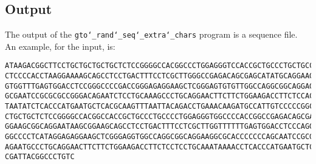 \subsection*{Output}
The output of the \texttt{gto\char`_rand\char`_seq\char`_extra\char`_chars} program is a sequence file.\\
An example, for the input, is:
\begin{lstlisting}
ATAAGACGGCTTCCTGCTGCTGCTGCTCTCCGGGGCCACGGCCCTGGAGGGTCCACCGCTGCCCTGCTGCCATTGTCCCC
CTCCCCACCTAAGGAAAAGCAGCCTCCTGACTTTCCTCGCTTGGGCCGAGACAGCGAGCATATGCAGGAAGCGGCAGGAA
GTGGTTTGAGTGGACCTCCGGGCCCCGACCGGGAGAGGAAGCTCGGGAGTGTGTTGGCCAGGCGGCAGGAGACCAGTGCC
GCGAATCCGCGCGCCGGGACAGAATCTCCTGCAAAGCCCTGCAGGAACTTCTTCTGGAAGACCTTCTCCACCCCCCCAGC
TAATATCTCACCCATGAATGCTCACGCAAGTTTAATTACAGACCTGAAACAAGATGCCATTGTCCCCCGGCCTCCTGCTG
CTGCTGCTCTCCGGGGCCACGGCCACCGCTGCCCTGCCCCTGGAGGGTGGCCCCACCGGCCGAGACAGCGAGCATATGCA
GGAAGCGGCAGGAATAAGCGGAAGCAGCCTCCTGACTTTCCTCGCTTGGTTTTTTGAGTGGACCTCCCAGGCCAGTGCCG
GGCCCCTCATAGGAGAGGAAGCTCGGGAGGTGGCCAGGCGGCAGGAAGGCGCACCCCCCCAGCAATCCGCGCGCCGGGAC
AGAATGCCCTGCAGGAACTTCTTCTGGAAGACCTTCTCCTCCTGCAAATAAAACCTCACCCATGAATGCTCACGCAAGTT
CGATTACGGCCCTGTC
\end{lstlisting}